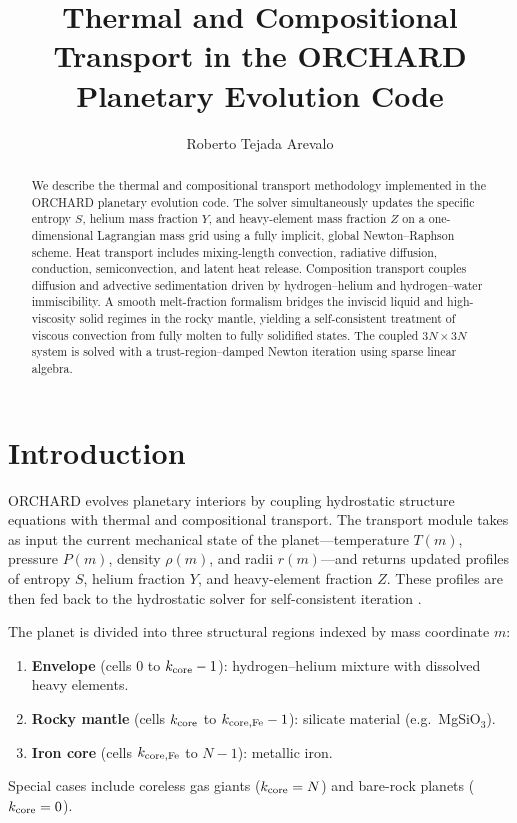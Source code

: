 \documentclass{aastex631}
\begin{document}
\title{Thermal and Compositional Transport in the ORCHARD Planetary Evolution Code}

\author{Roberto Tejada Arevalo}

\begin{abstract}
We describe the thermal and compositional transport methodology implemented
in the ORCHARD planetary evolution code.  The solver simultaneously updates
the specific entropy $S$, helium mass fraction $Y$, and heavy-element mass
fraction $Z$ on a one-dimensional Lagrangian mass grid using a fully
implicit, global Newton--Raphson scheme.  Heat transport includes
mixing-length convection, radiative diffusion, conduction, semiconvection,
and latent heat release.  Composition transport couples diffusion and
advective sedimentation driven by hydrogen--helium and hydrogen--water
immiscibility.  A smooth melt-fraction formalism bridges the inviscid
liquid and high-viscosity solid regimes in the rocky mantle, yielding a
self-consistent treatment of viscous convection from fully molten to fully
solidified states.  The coupled $3N\times 3N$ system is solved with a
trust-region--damped Newton iteration using sparse linear algebra.
\end{abstract}


\section{Introduction}\label{sec:intro}

ORCHARD evolves planetary interiors by coupling hydrostatic structure
equations with thermal and compositional transport.  The transport module
takes as input the current mechanical state of the planet---temperature
$T(m)$, pressure $P(m)$, density $\rho(m)$, and radii $r(m)$---and
returns updated profiles of entropy $S$, helium fraction $Y$, and
heavy-element fraction $Z$.  These profiles are then fed back to the
hydrostatic solver for self-consistent iteration
\citep{Henyey1964,Sur2024}.

The planet is divided into three structural regions indexed by mass
coordinate $m$:
\begin{enumerate}
  \item \textbf{Envelope} (cells $0$ to $k_{\rm core}-1$): hydrogen--helium
    mixture with dissolved heavy elements.
  \item \textbf{Rocky mantle} (cells $k_{\rm core}$ to $k_{\rm core,Fe}-1$):
    silicate material (e.g.\ MgSiO$_3$).
  \item \textbf{Iron core} (cells $k_{\rm core,Fe}$ to $N-1$): metallic iron.
\end{enumerate}
Special cases include coreless gas giants ($k_{\rm core}=N$) and bare-rock
planets ($k_{\rm core}=0$).
\end{document}
